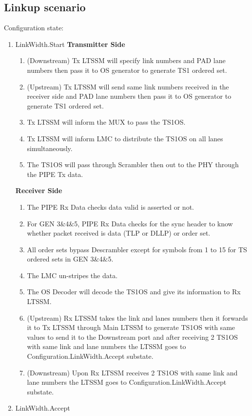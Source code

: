 \subsection{Linkup scenario}
Configuration state:\newline
\begin{enumerate}
\item LinkWidth.Start
\newline\textbf{Transmitter Side}
 \begin{enumerate}
  \item (Downstream) Tx LTSSM will specify link numbers and PAD lane numbers then pass it to OS generator to generate TS1 ordered set.
  \item (Upstream) Tx LTSSM will send same link numbers received in the receiver side and PAD lane numbers then pass it to OS generator to generate TS1 ordered set.
  \item Tx LTSSM will inform the MUX to pass the TS1OS.
  \item Tx LTSSM will inform LMC to distribute the TS1OS on all lanes simultaneously.
  \item The TS1OS will pass through Scrambler then out to the PHY through the PIPE Tx data.
\end{enumerate}
\textbf{Receiver Side}
\begin{enumerate}
  \item The PIPE Rx Data checks data valid is asserted or not.
  \item For GEN 3\&4\&5, PIPE Rx Data checks for the sync header to know whether packet received is data (TLP or DLLP) or order set.
  \item All order sets bypass Descrambler except for symbols from 1 to 15 for TS ordered sets in GEN 3\&4\&5.
  \item The LMC un-stripes the data.
  \item The OS Decoder will decode the TS1OS and give its information to Rx LTSSM.
  \item (Upstream) Rx LTSSM takes the link and lanes numbers then it forwards it to Tx LTSSM through Main LTSSM to generate TS1OS with same values to send it to the Downstream port and after receiving 2 TS1OS with same link and lane numbers the LTSSM goes to Configuration.LinkWidth.Accept substate.
  \item (Downstream) Upon Rx LTSSM receives 2 TS1OS with same link and lane numbers the LTSSM goes to Configuration.LinkWidth.Accept substate.
\end{enumerate}
\item LinkWidth.Accept

\end{enumerate}
